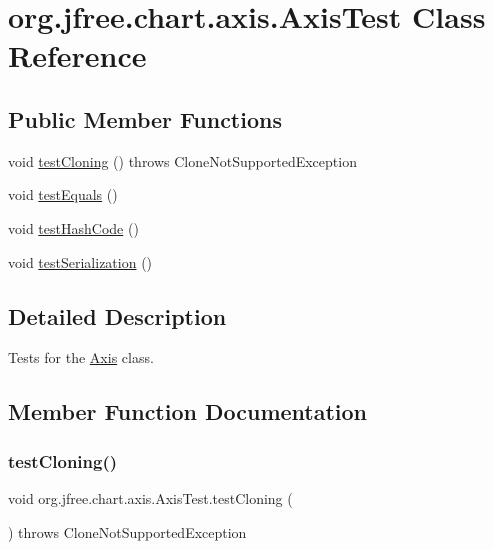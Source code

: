 \hypertarget{classorg_1_1jfree_1_1chart_1_1axis_1_1_axis_test}{}\section{org.\+jfree.\+chart.\+axis.\+Axis\+Test Class Reference}
\label{classorg_1_1jfree_1_1chart_1_1axis_1_1_axis_test}
\subsection*{Public Member Functions}
\begin{DoxyCompactItemize}
\item 
void \mbox{\hyperlink{classorg_1_1jfree_1_1chart_1_1axis_1_1_axis_test_aee3a7d5f9966f8d210af44289baeb8ef}{test\+Cloning}} ()  throws Clone\+Not\+Supported\+Exception 
\item 
void \mbox{\hyperlink{classorg_1_1jfree_1_1chart_1_1axis_1_1_axis_test_a9f909ad73723941b3e41fc37eee11878}{test\+Equals}} ()
\item 
void \mbox{\hyperlink{classorg_1_1jfree_1_1chart_1_1axis_1_1_axis_test_ab467668dea5eaea19b121a564c9f4627}{test\+Hash\+Code}} ()
\item 
void \mbox{\hyperlink{classorg_1_1jfree_1_1chart_1_1axis_1_1_axis_test_a3c8bfca994917aa866644e2f1c27d5b0}{test\+Serialization}} ()
\end{DoxyCompactItemize}


\subsection{Detailed Description}
Tests for the \mbox{\hyperlink{classorg_1_1jfree_1_1chart_1_1axis_1_1_axis}{Axis}} class. 

\subsection{Member Function Documentation}
\mbox{\label{classorg_1_1jfree_1_1chart_1_1axis_1_1_axis_test_aee3a7d5f9966f8d210af44289baeb8ef}} 
\subsubsection{\texorpdfstring{test\+Cloning()}{testCloning()}}
{\footnotesize\ttfamily void org.\+jfree.\+chart.\+axis.\+Axis\+Test.\+test\+Cloning (\begin{DoxyParamCaption}{ }\end{DoxyParamCaption}) throws Clone\+Not\+Supported\+Exception}

